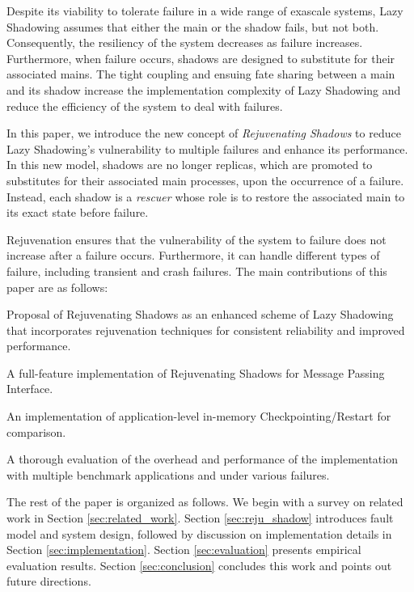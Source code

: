 Despite its viability to tolerate failure in a wide range of exascale systems, Lazy Shadowing assumes that either the main or the shadow fails, but not both. Consequently, the resiliency of the system decreases as failure increases. Furthermore, when failure occurs, shadows are designed to substitute for their associated mains. The tight coupling and ensuing fate sharing between a main and its shadow increase the implementation complexity of Lazy Shadowing and reduce the efficiency of the system to deal with failures. 

In this paper, we introduce the new concept of {\it Rejuvenating Shadows} to reduce Lazy Shadowing's vulnerability to multiple failures and enhance its performance. In this new model, shadows are no longer replicas, which are promoted to substitutes for their associated main processes, upon the occurrence of a failure. Instead, each shadow is a {\it rescuer} whose role is to restore the associated main to its exact state before failure. 

Rejuvenation ensures that the vulnerability of the system to failure does not increase after a failure occurs. Furthermore, it can handle different types of failure, including transient and crash failures. The main contributions of this paper are as follows:


\begin{itemize}
{
   \item Proposal of Rejuvenating Shadows as an enhanced scheme of Lazy Shadowing that incorporates rejuvenation techniques for consistent reliability and improved performance.
   \item A full-feature implementation of Rejuvenating Shadows for Message Passing Interface.
   \item An implementation of application-level in-memory Checkpointing/Restart for comparison.
   \item A thorough evaluation of the overhead and performance of the implementation with multiple benchmark applications and under various failures.
}
\end{itemize}

The rest of the paper is organized as follows. We begin with a survey on related work in Section 
\ref{sec:related_work}. Section \ref{sec:reju_shadow} introduces fault model and system design, followed by discussion on implementation details in Section \ref{sec:implementation}.
Section \ref{sec:evaluation} presents empirical evaluation results. Section \ref{sec:conclusion} concludes this work and points out future directions.



